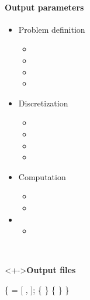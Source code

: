 
\begin{frame}[fragile] 
\secframetitle{\ssParameters}
\framesubtitle{Output parameters}
\vspace{-0.2in}
\begin{minipage}[t]{1.7in}
\begin{itemize}
\item Problem definition
  \begin{itemize}
  \item {}
  \item {}
  \item {}
  \item {}
  \end{itemize}
\item Discretization
  \begin{itemize}
  \item {}
  \item {}
  \item {}
  \item {}
  \end{itemize}
\item Computation
  \begin{itemize}
  \item {}
  \item {}
  \end{itemize}
\item {}
  \begin{itemize}
    \item {}
  \end{itemize}
\end{itemize}
\end{minipage} \
\begin{minipage}[t]{2.6in}
\vspace{-0.2in}
 \begin{block}<+->{\textbf{Output files}}
 \footnotesize \vspace{-0.1in}
\begin{semiverbatim}
 \{
    = [ ,  ];
   \subgroup{de_hdf5} \{
   \}
    \{
   \}
\}
\end{semiverbatim}
 \end{block}
 \end{minipage}
\end{frame}
 
